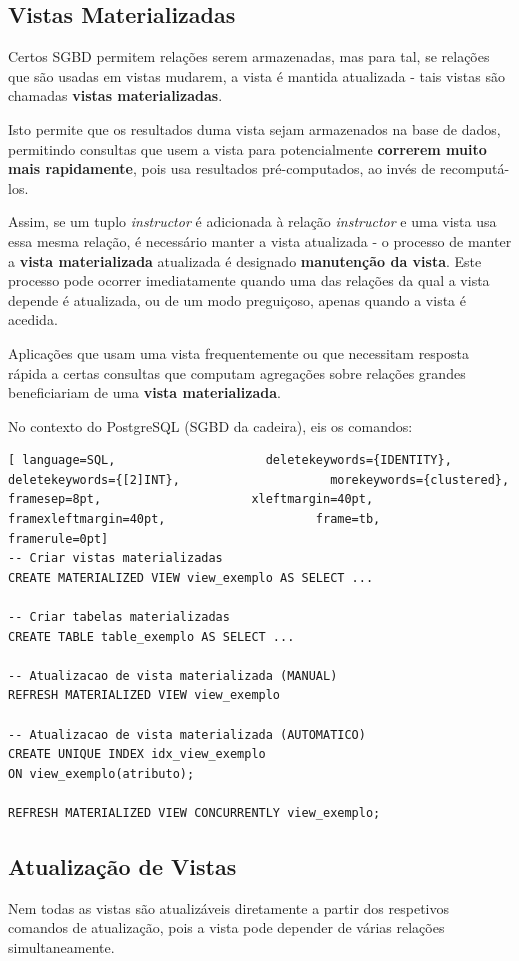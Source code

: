 \documentclass[oneside]{book}
\theoremstyle{definition}
\begin{document}
\subsection{Vistas Materializadas}
Certos SGBD permitem relações serem armazenadas, mas para tal, se relações que são usadas em vistas mudarem, a vista é mantida atualizada - tais vistas são chamadas \textbf{vistas materializadas}.

Isto permite que os resultados duma vista sejam armazenados na base de dados, permitindo consultas que usem a vista para potencialmente \textbf{correrem muito mais rapidamente}, pois usa resultados pré-computados, ao invés de recomputá-los.

Assim, se um tuplo \textit{instructor} é adicionada à relação \textit{instructor} e uma vista usa essa mesma relação, é necessário manter a vista atualizada - o processo de manter a \textbf{vista materializada} atualizada é designado \textbf{manutenção da vista}. Este processo pode ocorrer imediatamente quando uma das relações da qual a vista depende é atualizada, ou de um modo preguiçoso, apenas quando a vista é acedida. 

Aplicações que usam uma vista frequentemente ou que necessitam resposta rápida a certas consultas que computam agregações sobre relações grandes beneficiariam de uma \textbf{vista materializada}.

No contexto do PostgreSQL (SGBD da cadeira), eis os comandos:
\begin{lstlisting}[ language=SQL,                     deletekeywords={IDENTITY},                     deletekeywords={[2]INT},                     morekeywords={clustered},                     framesep=8pt,                     xleftmargin=40pt,                     framexleftmargin=40pt,                     frame=tb,                     framerule=0pt]
-- Criar vistas materializadas
CREATE MATERIALIZED VIEW view_exemplo AS SELECT ...

-- Criar tabelas materializadas
CREATE TABLE table_exemplo AS SELECT ...

-- Atualizacao de vista materializada (MANUAL)
REFRESH MATERIALIZED VIEW view_exemplo

-- Atualizacao de vista materializada (AUTOMATICO)
CREATE UNIQUE INDEX idx_view_exemplo
ON view_exemplo(atributo);

REFRESH MATERIALIZED VIEW CONCURRENTLY view_exemplo;
\end{lstlisting}

\subsection{Atualização de Vistas}
Nem todas as vistas são atualizáveis diretamente a partir dos respetivos comandos de atualização, pois a vista pode depender de várias relações simultaneamente.
\end{document}

